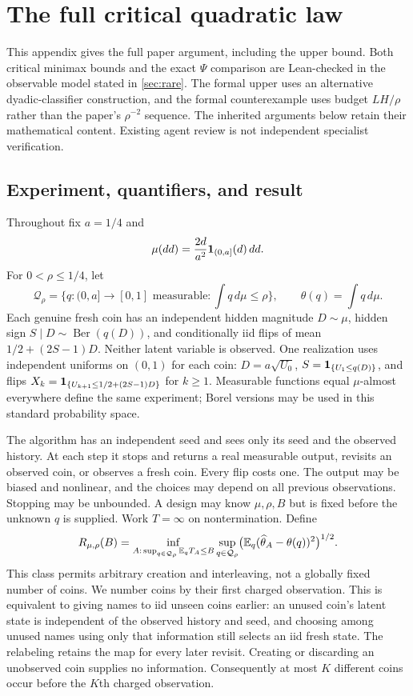 \section{The full critical quadratic law}\label{app:critical}
This appendix gives the full paper argument, including the upper bound.
Both critical minimax bounds and the exact $\Psi$ comparison are
Lean-checked in the observable model stated in \cref{sec:rare}.
The formal upper uses an alternative dyadic-classifier construction,
and the formal counterexample uses budget $LH/\rho$ rather than the
paper's $\rho^{-2}$ sequence. The inherited arguments below retain
their mathematical content. Existing agent review is not independent
specialist verification.

\subsection{Experiment, quantifiers, and result}
Throughout fix $a=1/4$ and
\[
 \mu(dd)=\frac{2d}{a^2}\mathbf 1_{(0,a]}(d)\,dd.
\]
For $0<\rho\le1/4$, let
\[
 \mathcal Q_\rho=\{q:(0,a]\to[0,1]\text{ measurable}:\int q\,d\mu\le\rho\},
 \qquad \theta(q)=\int q\,d\mu.
\]
Each genuine fresh coin has an independent hidden magnitude $D\sim\mu$,
hidden sign $S\mid D\sim\operatorname{Ber}(q(D))$, and conditionally iid
flips of mean $1/2+(2S-1)D$. Neither latent variable is observed. One realization
uses independent uniforms on $(0,1)$ for each coin: $D=a\sqrt{U_0}$,
$S=\mathbf 1_{\{U_1\le q(D)\}}$, and flips
$X_k=\mathbf 1_{\{U_{k+1}\le1/2+(2S-1)D\}}$ for $k\ge1$. Measurable functions
equal $\mu$-almost everywhere define the same experiment; Borel versions may
be used in this standard probability space.

The algorithm has an independent seed and sees only its seed and the observed
history. At each step it stops and returns a real measurable output, revisits
an observed coin, or observes a fresh coin. Every flip costs one. The output
may be biased and nonlinear, and the choices may depend on all previous
observations. Stopping may be unbounded. A design may know $\mu,\rho,B$ but is
fixed before the unknown $q$ is supplied. Work $T=\infty$ on nontermination.
Define
\[
 R_{\mu,\rho}(B)=\inf_{A:\,\sup_{q\in\mathcal Q_\rho}\mathbb E_qT_A\le B}
       \sup_{q\in\mathcal Q_\rho}\bigl(\mathbb E_q(\widehat\theta_A-\theta(q))^2\bigr)^{1/2}.
\]
This class permits arbitrary creation and interleaving, not a globally fixed
number of coins. We number coins by their first charged observation. This
is equivalent to giving names to iid unseen coins earlier: an unused coin's
latent state is independent of the observed history and seed, and choosing
among unused names using only that information still selects an iid fresh
state. The relabeling retains the map for every later revisit. Creating or
discarding an unobserved coin supplies no information. Consequently at most
$K$ different coins occur before the $K$th charged observation.

